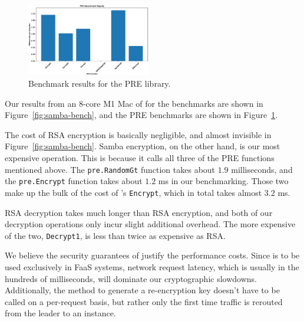 \begin{figure}
	\centering
	\includegraphics[width=0.48\textwidth]{figs/pre-bench}
	\caption{Benchmark results for the PRE library.}
	\label{fig:pre-bench}
\end{figure}


Our results from an 8-core M1 Mac of for the \SystemName benchmarks are shown in Figure~\ref{fig:samba-bench}, and the PRE benchmarks are shown in Figure~\ref{fig:pre-bench}.

The cost of RSA encryption is basically negligible, and almost invisible in Figure~\ref{fig:samba-bench}. Samba encryption, on the other hand, is our most expensive operation.
This is because it calls all three of the PRE functions mentioned above. The \texttt{pre.RandomGt} function takes about $1.9$ milliseconds, and the \texttt{pre.Encrypt} function takes about $1.2$ ms in our benchmarking.
Those two make up the bulk of the cost of \SystemName's \texttt{Encrypt}, which in total takes almost $3.2$ ms. 

RSA decryption takes much longer than RSA encryption, and both of our \SystemName decryption operations only incur slight additional overhead. The more expensive of the two, \texttt{Decrypt1}, is less than twice as expensive as RSA.

We believe the security guarantees of \SystemName justify the performance costs.
Since \SystemName is to be used exclusively in FaaS systems, network request latency, which is usually in the hundreds of milliseconds, will dominate our cryptographic slowdowns.
Additionally, the method to generate a re-encryption key doesn't have to be called on a per-request basis, but rather only the first time traffic is rerouted from the leader to an instance.




